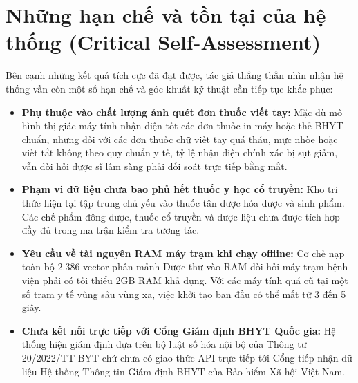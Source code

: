 \section{Những hạn chế và tồn tại của hệ thống (Critical Self-Assessment)}
\label{sec:limitations}

Bên cạnh những kết quả tích cực đã đạt được, tác giả thẳng thắn nhìn nhận hệ thống vẫn còn một số hạn chế và góc khuất kỹ thuật cần tiếp tục khắc phục:

\begin{itemize}[leftmargin=1.5em]
    \item \textbf{Phụ thuộc vào chất lượng ảnh quét đơn thuốc viết tay:} Mặc dù mô hình thị giác máy tính nhận diện tốt các đơn thuốc in máy hoặc thẻ BHYT chuẩn, nhưng đối với các đơn thuốc chữ viết tay quá tháu, mực nhòe hoặc viết tắt không theo quy chuẩn y tế, tỷ lệ nhận diện chính xác bị sụt giảm, vẫn đòi hỏi dược sĩ lâm sàng phải đối soát trực tiếp bằng mắt.
    \item \textbf{Phạm vi dữ liệu chưa bao phủ hết thuốc y học cổ truyền:} Kho tri thức hiện tại tập trung chủ yếu vào thuốc tân dược hóa dược và sinh phẩm. Các chế phẩm đông dược, thuốc cổ truyền và dược liệu chưa được tích hợp đầy đủ trong ma trận kiểm tra tương tác.
    \item \textbf{Yêu cầu về tài nguyên RAM máy trạm khi chạy offline:} Cơ chế nạp toàn bộ 2.386 vector phân mảnh Dược thư vào RAM đòi hỏi máy trạm bệnh viện phải có tối thiểu 2GB RAM khả dụng. Với các máy tính quá cũ tại một số trạm y tế vùng sâu vùng xa, việc khởi tạo ban đầu có thể mất từ 3 đến 5 giây.
    \item \textbf{Chưa kết nối trực tiếp với Cổng Giám định BHYT Quốc gia:} Hệ thống hiện giám định dựa trên bộ luật số hóa nội bộ của Thông tư 20/2022/TT-BYT chứ chưa có giao thức API trực tiếp tới Cổng tiếp nhận dữ liệu Hệ thống Thông tin Giám định BHYT của Bảo hiểm Xã hội Việt Nam.
\end{itemize}

